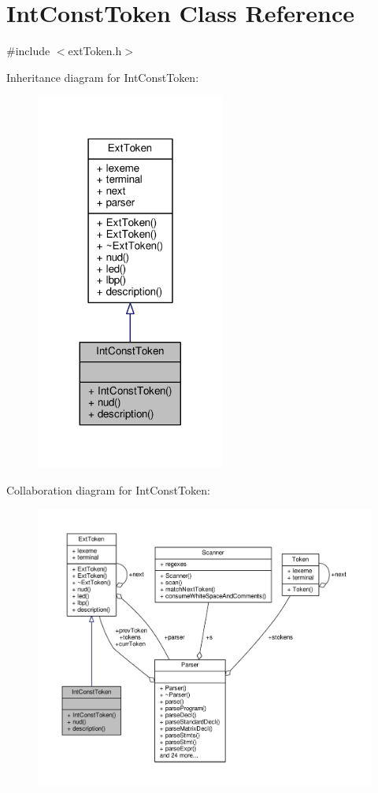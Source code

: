 \hypertarget{classIntConstToken}{\section{Int\-Const\-Token Class Reference}
\label{classIntConstToken}
}


{\ttfamily \#include $<$ext\-Token.\-h$>$}



Inheritance diagram for Int\-Const\-Token\-:\nopagebreak
\begin{figure}[H]
\begin{center}
\leavevmode
\includegraphics[width=176pt]{classIntConstToken__inherit__graph}
\end{center}
\end{figure}


Collaboration diagram for Int\-Const\-Token\-:\nopagebreak
\begin{figure}[H]
\begin{center}
\leavevmode
\includegraphics[width=350pt]{classIntConstToken__coll__graph}
\end{center}
\end{figure}
